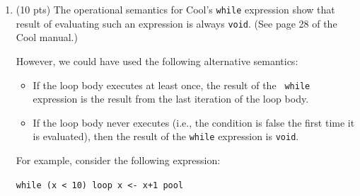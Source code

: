 \documentclass[10pt]{article}
\newcommand{\ossimple}[6]{#1,#2,#3\vdash #4 : #5,#6}
\newcommand{\osrule}[8]{\frac{#7}{\ossimple{#1}{#2}{#3}{#4}{#5}{#6}}\eqno
  \mbox{#8}}
\begin{document}
\begin{enumerate}
$$\osrule{so}{E}{S} {a[e_1]<-\ e_2}{v_2}{S_4}
  {\begin{array}{l}
  \textrm{$v_a=array(a_1:I_1,\ldots,a_n:I_n)$}\ \  \\
  \ossimple{so}{E}{S_1}{e_1}{Int(t)}{S_2}\ \ 1<=t<=n \\
  \ossimple{so}{E}{S_2}{e_2}{v_1}{S_3}\\
  \textrm{$E(a)=I_x$}\\
  \textrm{$S_2(I_x)=v_a$}\\
  \textrm{$S_2=S_1[v_1/I_x]$}\\
   \textrm{$S_4=S_3[v_2/I_m]$}\\
   \end{array}}{}
$$
\\ \\
$$\osrule{so}{E}{S} {a[e]}{v}{S_2}
  {\begin{array}{l}
  \ossimple{so}{E}{S}{e}{Int(t)}{S_1}\ \ 1<=t<=n \\
  \textrm{$v_a=array(a_1:I_1,\ldots,a_n:I_n)$}\ \  \\
  \textrm{$E(a)=I_a$}\\
  \textrm{$S_2(I_a)=v_a$}\\
  \textrm{$v=S_2(I_m)$}\\
   \end{array}}{}
$$

\pagebreak

\item (10 pts)
The operational semantics for Cool's {\tt while} expression show that
result of evaluating such an expression is always {\tt void}.  (See page
28 of the Cool manual.)

However, we could have used the following alternative semantics:

\begin{itemize}

\item If the loop body executes at least once, the result of the {\tt
while} expression is the result from the last iteration of the loop body.

\item If the loop body never executes (i.e., the condition is false the
first time it is evaluated), then the result of the {\tt while} expression
is {\tt void}.

\end{itemize}

For example, consider the following expression:

\begin{center}
{\tt while (x < 10) loop x <- x+1 pool}
\end{center}


\end{enumerate}
\end{document}
